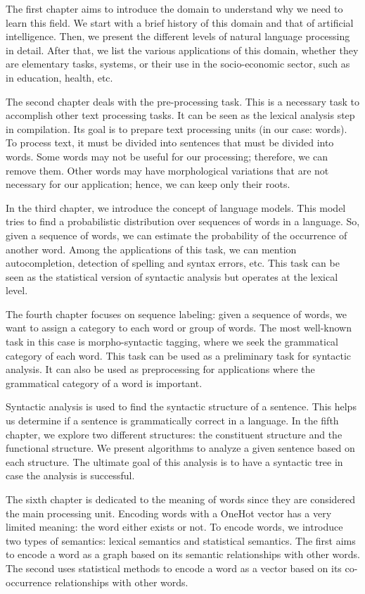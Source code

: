 \documentclass{KodeBook}
\begin{document}
The first chapter aims to introduce the domain to understand why we need to learn this field.
We start with a brief history of this domain and that of artificial intelligence.
Then, we present the different levels of natural language processing in detail.
After that, we list the various applications of this domain, whether they are elementary tasks, systems, or their use in the socio-economic sector, such as in education, health, etc.

The second chapter deals with the pre-processing task.
This is a necessary task to accomplish other text processing tasks.
It can be seen as the lexical analysis step in compilation.
Its goal is to prepare text processing units (in our case: words).
To process text, it must be divided into sentences that must be divided into words.
Some words may not be useful for our processing; therefore, we can remove them.
Other words may have morphological variations that are not necessary for our application; hence, we can keep only their roots.

In the third chapter, we introduce the concept of language models.
This model tries to find a probabilistic distribution over sequences of words in a language.
So, given a sequence of words, we can estimate the probability of the occurrence of another word.
Among the applications of this task, we can mention autocompletion, detection of spelling and syntax errors, etc.
This task can be seen as the statistical version of syntactic analysis but operates at the lexical level.

The fourth chapter focuses on sequence labeling: given a sequence of words, we want to assign a category to each word or group of words.
The most well-known task in this case is morpho-syntactic tagging, where we seek the grammatical category of each word.
This task can be used as a preliminary task for syntactic analysis.
It can also be used as preprocessing for applications where the grammatical category of a word is important.

Syntactic analysis is used to find the syntactic structure of a sentence.
This helps us determine if a sentence is grammatically correct in a language.
In the fifth chapter, we explore two different structures: the constituent structure and the functional structure.
We present algorithms to analyze a given sentence based on each structure.
The ultimate goal of this analysis is to have a syntactic tree in case the analysis is successful.

The sixth chapter is dedicated to the meaning of words since they are considered the main processing unit.
Encoding words with a OneHot vector has a very limited meaning: the word either exists or not.
To encode words, we introduce two types of semantics: lexical semantics and statistical semantics.
The first aims to encode a word as a graph based on its semantic relationships with other words.
The second uses statistical methods to encode a word as a vector based on its co-occurrence relationships with other words.
\end{document}
